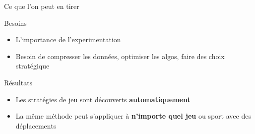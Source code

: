 \documentclass[aspectratio=169, 11pt]{beamer}
\begin{document}
\begin{frame}{Ce que l'on peut en tirer}

\centering
\vspace{0.4cm}

\begin{exampleblock}{Besoins}
\centering
\begin{itemize}\setlength{\itemsep}{14pt}\large
    \item L'importance de l'experimentation
    \item Besoin de compresser les données, optimiser les algos, faire des choix stratégique

\end{itemize}
\end{exampleblock}


\vspace{0.4cm}
\begin{alertblock}{Résultats}
\centering
\begin{itemize}\setlength{\itemsep}{14pt}\large

    \item Les stratégies de jeu sont découverts \textbf{automatiquement}
    \item La même méthode peut s'appliquer à \textbf{n'importe quel jeu} ou sport avec des déplacements
\end{itemize}

\end{alertblock}

\end{frame}
\end{document}

